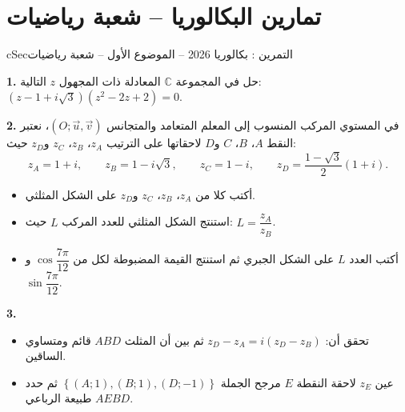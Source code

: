 \documentclass[12pt,a4paper]{article}
\newenvironment{BOX}[2]{\begin{otherlanguage}{english}\begin{arbox}{#1}{#2}}{\end{arbox}\end{otherlanguage}}
\newcounter{exo}
\newenvironment{tamrin}[1]{\stepcounter{exo}\begin{BOX}{cSec}{التمرين \theexo: #1}}{\end{BOX}}
\newenvironment{sq}{\begin{itemize}[leftmargin=2.4em,itemsep=3pt]}{\end{itemize}}
\newcommand{\qa}{\item[(أ)]}\newcommand{\qb}{\item[(ب)]}\newcommand{\qc}{\item[(جـ)]}\newcommand{\qd}{\item[(د)]}\newcommand{\qe}{\item[(هـ)]}
\newcommand{\QQ}[1]{\par\smallskip\textbf{#1.} }
\begin{document}
\section{تمارين البكالوريا -- شعبة رياضيات}
\begin{tamrin}{بكالوريا 2026 -- الموضوع الأول -- شعبة رياضيات}
\QQ{1} حل في المجموعة $\mathbb{C}$ المعادلة ذات المجهول $z$ التالية: $\left(z-1+i\sqrt3\right)\left(z^2-2z+2\right)=0$.

\QQ{2} في المستوي المركب المنسوب إلى المعلم المتعامد والمتجانس $\left(O;\vec u,\vec v\right)$، نعتبر النقط $A$، $B$، $C$ و$D$ لاحقاتها على الترتيب $z_A$، $z_B$، $z_C$ و$z_D$ حيث:
\[z_A=1+i,\qquad z_B=1-i\sqrt3,\qquad z_C=1-i,\qquad z_D=\frac{1-\sqrt3}{2}(1+i).\]
\begin{sq}
\qa أكتب كلا من $z_A$، $z_B$، $z_C$ و$z_D$ على الشكل المثلثي.
\qb استنتج الشكل المثلثي للعدد المركب $L$ حيث: $L=\dfrac{z_A}{z_B}$.
\qc أكتب العدد $L$ على الشكل الجبري ثم استنتج القيمة المضبوطة لكل من $\cos\dfrac{7\pi}{12}$ و$\sin\dfrac{7\pi}{12}$.
\end{sq}
\QQ{3}
\begin{sq}
\qa تحقق أن: $z_D-z_A=i\left(z_D-z_B\right)$ ثم بين أن المثلث $ABD$ قائم ومتساوي الساقين.
\qb عين $z_E$ لاحقة النقطة $E$ مرجح الجملة $\left\{(A;1),(B;1),(D;-1)\right\}$ ثم حدد طبيعة الرباعي $AEBD$.
\end{sq}
\end{tamrin}
\end{document}
